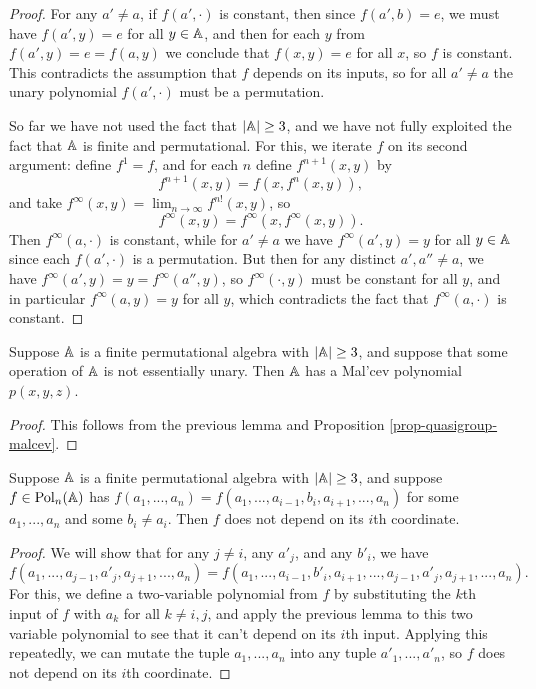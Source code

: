 \begin{appendices}
\begin{proof}
For any $a' \ne a$, if $f(a',\cdot)$ is constant, then since $f(a',b) = e$, we must have $f(a',y) = e$ for all $y \in \mathbb{A}$, and then for each $y$ from $f(a',y) = e = f(a,y)$ we conclude that $f(x,y) = e$ for all $x$, so $f$ is constant. This contradicts the assumption that $f$ depends on its inputs, so for all $a' \ne a$ the unary polynomial $f(a', \cdot)$ must be a permutation.%

So far we have not used the fact that $|\mathbb{A}| \ge 3$, and we have not fully exploited the fact that $\mathbb{A}$ is finite and permutational. For this, we iterate $f$ on its second argument: define $f^1 = f$, and for each $n$ define $f^{n+1}(x,y)$ by
\[
f^{n+1}(x,y) = f(x,f^n(x,y)),
\]
and take $f^\infty(x,y) = \lim_{n \rightarrow \infty} f^{n!}(x,y)$, so
\[
f^\infty(x,y) = f^\infty(x,f^\infty(x,y)).
\]
Then $f^\infty(a,\cdot)$ is constant, while for $a' \ne a$ we have $f^\infty(a',y) = y$ for all $y \in \mathbb{A}$ since each $f(a',\cdot)$ is a permutation. But then for any distinct $a',a'' \ne a$, we have $f^\infty(a',y) = y = f^\infty(a'',y)$, so $f^\infty(\cdot,y)$ must be constant for all $y$, and in particular $f^\infty(a,y) = y$ for all $y$, which contradicts the fact that $f^\infty(a,\cdot)$ is constant.
\end{proof}

\begin{cor}\label{cor-permutational-malcev} Suppose $\mathbb{A}$ is a finite permutational algebra with $|\mathbb{A}| \ge 3$, and suppose that some operation of $\mathbb{A}$ is not essentially unary. Then $\mathbb{A}$ has a Mal'cev polynomial $p(x,y,z)$.
\end{cor}
\begin{proof} This follows from the previous lemma and Proposition \ref{prop-quasigroup-malcev}.
\end{proof}

\begin{cor}\label{cor-permutational-depend} Suppose $\mathbb{A}$ is a finite permutational algebra with $|\mathbb{A}| \ge 3$, and suppose $f \in \operatorname{Pol}_n(\mathbb{A})$ has $f(a_1, ..., a_n) = f(a_1, ..., a_{i-1}, b_i, a_{i+1}, ..., a_n)$ for some $a_1, ..., a_n$ and some $b_i \ne a_i$. Then $f$ does not depend on its $i$th coordinate.
\end{cor}
\begin{proof} We will show that for any $j \ne i$, any $a'_j$, and any $b'_i$, we have
\[
f(a_1, ..., a_{j-1}, a'_j, a_{j+1}, ..., a_n) = f(a_1, ..., a_{i-1}, b'_i, a_{i+1}, ..., a_{j-1}, a'_j, a_{j+1}, ..., a_n).
\]
For this, we define a two-variable polynomial from $f$ by substituting the $k$th input of $f$ with $a_k$ for all $k \ne i,j$, and apply the previous lemma to this two variable polynomial to see that it can't depend on its $i$th input. Applying this repeatedly, we can mutate the tuple $a_1, ..., a_n$ into any tuple $a'_1, ..., a'_n$, so $f$ does not depend on its $i$th coordinate.
\end{proof}


\end{appendices}
